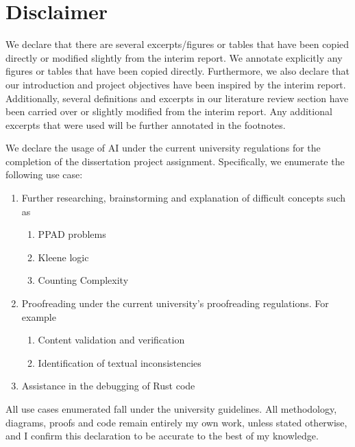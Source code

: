 \section*{Disclaimer}

\vspace{2cm}

\large


We declare that there are several excerpts/figures or tables that have been copied
directly or modified slightly from the interim report. We annotate explicitly
any figures or tables that have been copied directly. Furthermore, we also declare that
our introduction and project objectives
have been inspired by the interim report.
Additionally, several definitions and excerpts in our literature review section
have been carried over or slightly modified
from the interim report.
Any additional excerpts that were used will be further annotated in the footnotes.


We declare the usage of AI under the current university regulations for the completion of the dissertation project assignment. Specifically, we enumerate the following use case:
\begin{enumerate}
    \item Further researching, brainstorming and explanation of difficult concepts such as
          \begin{enumerate}
              \item PPAD problems
              \item Kleene logic
              \item Counting Complexity
          \end{enumerate}
    \item Proofreading under the current university's proofreading regulations. For example
          \begin{enumerate}
              \item Content validation and verification
              \item Identification of textual inconsistencies
          \end{enumerate}
    \item Assistance in the debugging of Rust code
\end{enumerate}

All use cases enumerated fall under the university guidelines.
All methodology, diagrams, proofs and code remain entirely my own work,
unless stated otherwise,
and I confirm this declaration to be accurate to the best of my knowledge.
